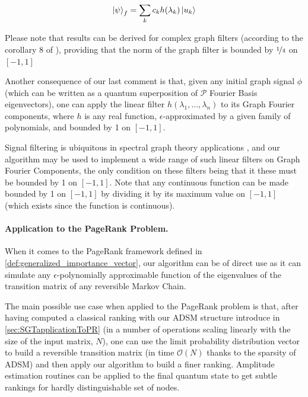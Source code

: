 \documentclass[sn-mathphys]{sn-jnl}%
\theoremstyle{thmstyleone}%
\theoremstyle{thmstyletwo}%
\theoremstyle{thmstylethree}%
\begin{document}
\begin{equation}
    \ket{\psi}_f = \sum_k c_k h(\lambda_k) \ket{u_k} 
\end{equation}

Please note that results can be derived for complex graph filters
(according to the corollary 8 of \cite{gilyen_su_low_wiebe_2019}),
providing that the norm of the graph filter is bounded by
$\nicefrac{1}{4}$ on $[-1,1]$

Another consequence of our last comment is that, given any initial
graph signal $\phi$ (which can be written as a quantum superposition
of $\mathcal{P}$ Fourier Basis eigenvectors), one can apply the linear
filter $h(\lambda_1, \hdots, \lambda_n)$ to its Graph Fourier
components, where $h$ is any real function, $\epsilon$-approximated by
a given family of polynomials, and bounded by 1 on $[-1,1]$.

Signal filtering is ubiquitous in spectral graph theory applications
\cite{sandryhaila_moura_2014,
  shuman_narang_frossard_ortega_vandergheynst_2013, sevi2019,
  ortega_frossard_kovacevic_moura_vandergheynst_2018}, and our
algorithm may be used to implement a wide range of such linear filters
on Graph Fourier Components, the only condition on these filters being
that it these must be bounded by 1 on $[-1,1]$. Note that any
continuous function can be made bounded by 1 on $[-1,1]$ by dividing
it by its maximum value on $[-1,1]$ (which exists since the function
is continuous).

\paragraph{Application to the PageRank Problem.}
When it comes to the PageRank framework defined in
\ref{def:generalized_importance_vector}, our algorithm can be of
direct use as it can simulate any $\epsilon$-polynomially approximable function of the eigenvalues of the transition matrix of any
reversible Markov Chain.

The main possible use case when applied to the PageRank problem is
that, after having computed a classical ranking with our ADSM structure introduce in \ref{sec:SGTapplicationToPR} (in a number of operations scaling linearly with the size of the input matrix, $N$), one can use the limit probability
distribution vector to build a reversible transition matrix (in time $\mathcal{O}(N)$ thanks to the sparsity of ADSM) and then
apply our algorithm to build a finer ranking. Amplitude estimation
routines can be applied to the final quantum state to get subtle
rankings for hardly distinguishable set of nodes. 
\end{document}
